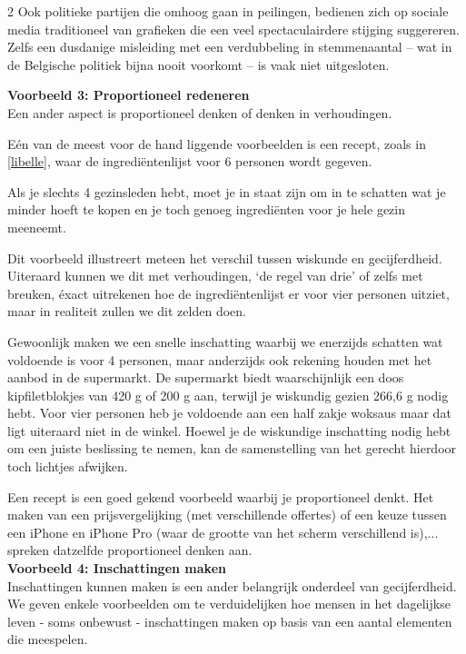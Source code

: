 \begin{multicols}{2}
Ook politieke partijen die omhoog gaan in peilingen, bedienen zich op sociale media traditioneel van grafieken die een veel spectaculairdere stijging suggereren. Zelfs een dusdanige misleiding met een verdubbeling in stemmenaantal -- wat in de Belgische politiek bijna nooit voorkomt -- is vaak niet uitgesloten.

\textbf{Voorbeeld 3: Proportioneel redeneren}\\
Een ander aspect is proportioneel denken of denken in verhoudingen. 

Eén van de meest voor de hand liggende voorbeelden is een recept, zoals in \autoref{libelle}, waar de ingrediëntenlijst  voor 6 personen wordt gegeven. 


Als je slechts 4 gezinsleden hebt, moet je in staat zijn om in te schatten wat je minder hoeft te kopen en je toch genoeg ingrediënten voor je hele gezin meeneemt. 

Dit voorbeeld illustreert meteen het verschil tussen wiskunde en gecijferdheid. Uiteraard kunnen we dit met verhoudingen, `de regel van drie' of zelfs met breuken, éxact uitrekenen hoe de ingrediëntenlijst er voor vier personen uitziet, maar in realiteit zullen we dit zelden doen. 

Gewoonlijk maken we een snelle inschatting waarbij we enerzijds schatten wat voldoende is voor 4 personen, maar anderzijds ook rekening houden met het aanbod in de supermarkt. De supermarkt biedt waarschijnlijk een doos kipfiletblokjes van 420 g of 200 g aan, terwijl je wiskundig gezien 266,6 g nodig hebt. Voor vier personen heb je voldoende aan een half zakje woksaus maar dat ligt uiteraard niet in de winkel. Hoewel je de wiskundige inschatting nodig hebt om een juiste beslissing te nemen, kan de samenstelling van het gerecht hierdoor toch lichtjes afwijken.

Een recept is een goed gekend voorbeeld waarbij je proportioneel denkt. Het maken van een prijsvergelijking (met verschillende offertes) of een keuze tussen een iPhone en iPhone Pro (waar de grootte van het scherm verschillend is),... spreken datzelfde proportioneel denken aan. \\

\noindent \textbf{Voorbeeld 4: Inschattingen maken}\\
\noindent Inschattingen kunnen maken is een ander belangrijk onderdeel van gecijferdheid. We geven enkele voorbeelden om te verduidelijken hoe mensen in het dagelijkse leven - soms onbewust - inschattingen maken op basis van een aantal elementen die meespelen. 


\end{multicols}
